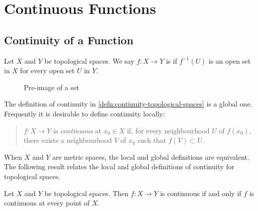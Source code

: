 \section{Continuous Functions}
\subsection{Continuity of a Function}
\begin{definition}\label{defn:continuity-topological-spaces}
Let $X$ and $Y$ be topological spaces. We say $f\colon X\to Y$ is  if $f^{-1}(U)$ is an open set in $X$ for every open set $U$ in $Y$.
\end{definition}

\begin{figure}[H]
\centering
{}
\caption{Pre-image of a set}
\end{figure}

The definition of continuity in \cref{defn:continuity-topological-spaces} is a global one. 
Frequently it is desirable to define continuity locally:
\begin{quote}
$f\colon X\to Y$ is \emph{continuous} at $x_0\in X$ if, for every neighbourhood $U$ of $f(x_0)$, there exists a neighbourhood $V$ of $x_0$ such that $f(V)\subset U$. 
\end{quote}

When $X$ and $Y$ are metric spaces, the local and global definitions are equivalent. 
The following result relates the local and global definitions of continuity for topological spaces.

\begin{lemma}
Let $X$ and $Y$ be topological spaces. Then $f\colon X\to Y$ is continuous if and only if $f$ is continuous at every point of $X$. 
\end{lemma}

